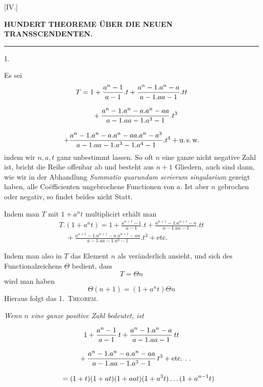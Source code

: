\clearpage{}

\begin{center}
[IV.]\par
\bigskip
\textbf{HUNDERT THEOREME ÜBER DIE NEUEN TRANSSCENDENTEN.}\par
\medskip
\rule{.09\textwidth}{.3pt}\par
\bigskip
{}1.
\end{center}
Es sei
\[
\begin{gathered}
T={}1+\frac{a^n-1}{a-1}.t
+\frac{a^n-1.a^n-a}{a-1.aa-1}.tt
\\[8pt]\quad{}+\frac{a^n-1.a^n-a.a^n-aa}{a-1.aa-1.a^3-1}.t^3\\[8pt]
+\frac{a^n-1.a^n-a.a^n-aa.a^n-a^3}
{a-1.aa-1.a^3-1.a^4-1}.t^4+\text{u.\,s.\,w.}
\end{gathered}
\]
indem wir $n,a,t$ ganz unbestimmt lassen. So oft $n$ eine ganze nicht negative
Zahl ist, bricht die Reihe offenbar ab und besteht aus $n+1$ Gliedern, auch sind
dann, wie wir in der Abhandlung \textit{Summatio quarundam serierum singularium} gezeigt haben, alle Coëfficienten ungebrochene Functionen von $a$. Ist aber $n$ gebrochen oder negativ, so findet beides nicht Statt.

Indem man $T$ mit $1+a^n t$ multiplicirt erhält man
\[
\begin{gathered}T.(1+a^n t)=1+\frac{a^{n+1}-1}{a-1}.t
+\frac{a^{n+1}-1.a^{n+1}-a}{a-1.aa-1}.tt
\\[8pt]\quad{}+\frac{a^{n+1}-1.a^{n+1}-a.a^{n+1}-aa}{a-1.aa-1.a^3-1}.t^3
+\text{etc.}\end{gathered}
\]

Indem man also in $T$ das Element $n$ als veränderlich ansieht, und sich
des Functionalzeichens $\Theta$ bedient, dass
\[
T=\Theta n
\]
wird man haben
\[
\Theta(n+1)=(1+a^n t)\Theta n
\]
Hieraus folgt das 1.\ \textsc{Theorem.}



\begin{center}
\textit{Wenn $n$ eine ganze positive Zahl bedeutet, ist}
\end{center}
\[
\begin{gathered}
1+\frac{a^n-1}{a-1}\,t
 +\frac{a^n-1.a^n-a}{a-1.aa-1}\,tt
 \\[8pt]\quad{}+\frac{a^n-1.a^n-a.a^n-aa}{a-1.aa-1.a^3-1}\,t^3
 +\text{etc.}\ .\ .
\\[8pt]
\qquad=(1+t)(1+at)(1+aat)(1+a^3t)\mathinner{.\,.\,.}(1+a^{n-1}t)
\end{gathered}
\]


